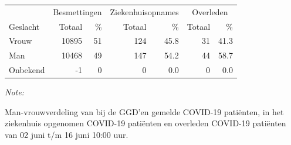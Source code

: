 \documentclass[
  english,
  man,floatsintext]{apa6}
\begin{document}
\begin{table}
\centering\begingroup\fontsize{11}{13}\selectfont

\begin{threeparttable}
\begin{tabular}{lrrrrrr}
\toprule
\multicolumn{1}{c}{ } & \multicolumn{2}{c}{Besmettingen} & \multicolumn{2}{c}{Ziekenhuisopnames} & \multicolumn{2}{c}{Overleden} \\
\cmidrule(l{3pt}r{3pt}){2-3} \cmidrule(l{3pt}r{3pt}){4-5} \cmidrule(l{3pt}r{3pt}){6-7}
Geslacht & Totaal & \% & Totaal & \% & Totaal & \%\\
\midrule
Vrouw & 10895 & 51 & 124 & 45.8 & 31 & 41.3\\
Man & 10468 & 49 & 147 & 54.2 & 44 & 58.7\\
Onbekend & -1 & 0 & 0 & 0.0 & 0 & 0.0\\
\bottomrule
\end{tabular}
\begin{tablenotes}
\item \textit{Note: } 
\item Man-vrouwverdeling van bij de GGD’en gemelde COVID-19 patiënten, in het ziekenhuis opgenomen COVID-19 patiënten en overleden COVID-19 patiënten van 02 juni t/m 16 juni 10:00 uur.
\end{tablenotes}
\end{threeparttable}
\endgroup{}
\end{table}
\newpage
\end{document}
